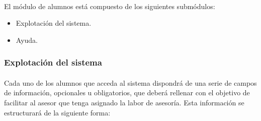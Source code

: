       \paragraph{}El módulo de alumnos está compuesto de los siguientes
      submódulos:

      \begin{itemize}
       \item Explotación del sistema.
       \item Ayuda.
      \end{itemize}

      \subsubsection{Explotación del sistema}

      \paragraph{}Cada uno de los alumnos que acceda al sistema dispondrá
      de una serie de campos de información, opcionales u obligatorios, que
      deberá rellenar con el objetivo de facilitar al asesor que tenga asignado
      la labor de asesoría. Esta información se estructurará de la siguiente
      forma:

